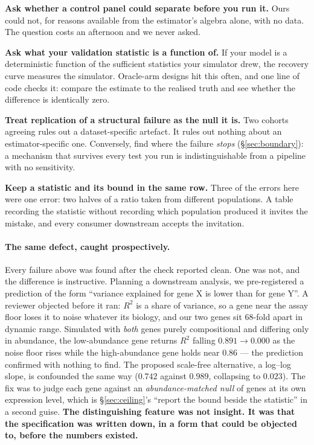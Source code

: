 \documentclass{article}
\begin{document}
\textbf{Ask whether a control panel could separate before you run it.} Ours could
not, for reasons available from the estimator's algebra alone, with no data. The
question costs an afternoon and we never asked.

\textbf{Ask what your validation statistic is a function of.} If your model is a
deterministic function of the sufficient statistics your simulator drew, the
recovery curve measures the simulator. Oracle-arm designs hit this often, and one
line of code checks it: compare the estimate to the realised truth and see
whether the difference is identically zero.

\textbf{Treat replication of a structural failure as the null it is.} Two cohorts
agreeing rules out a dataset-specific artefact. It rules out nothing about an
estimator-specific one. Conversely, find where the failure \emph{stops}
(\S\ref{sec:boundary}): a mechanism that survives every test you run is
indistinguishable from a pipeline with no sensitivity.

\textbf{Keep a statistic and its bound in the same row.} Three of the errors here
were one error: two halves of a ratio taken from different populations. A table
recording the statistic without recording which population produced it invites
the mistake, and every consumer downstream accepts the invitation.

\paragraph{The same defect, caught prospectively.} Every failure above was found
after the check reported clean. One was not, and the difference is instructive.
Planning a downstream analysis, we pre-registered a prediction of the form
``variance explained for gene X is lower than for gene Y''. A reviewer objected
before it ran: $R^2$ is a share of variance, so a gene near the assay floor loses
it to noise whatever its biology, and our two genes sit 68-fold apart in dynamic
range. Simulated with \emph{both} genes purely compositional and differing only
in abundance, the low-abundance gene returns $R^2$ falling $0.891 \rightarrow
0.000$ as the noise floor rises while the high-abundance gene holds near $0.86$
--- the prediction confirmed with nothing to find. The proposed scale-free
alternative, a log--log slope, is confounded the same way ($0.742$ against
$0.989$, collapsing to $0.023$). The fix was to judge each gene against an
\emph{abundance-matched null} of genes at its own expression level, which is
\S\ref{sec:ceiling}'s ``report the bound beside the statistic'' in a second
guise. \textbf{The distinguishing feature was not insight. It was that the
specification was written down, in a form that could be objected to, before the
numbers existed.}
\end{document}

